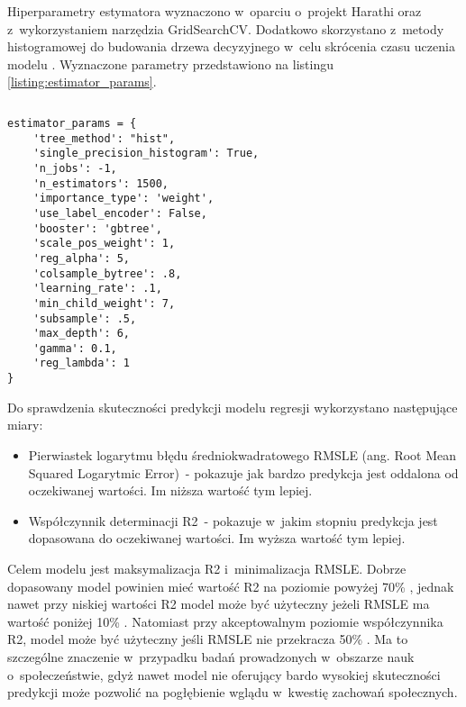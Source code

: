 Hiperparametry estymatora wyznaczono w~oparciu o~projekt Harathi \cite{harathi-2018} oraz z~wykorzystaniem narzędzia GridSearchCV.
Dodatkowo skorzystano z~metody histogramowej do budowania drzewa decyzyjnego w~celu skrócenia czasu uczenia modelu \cite{golarnyk-2021}.
Wyznaczone parametry przedstawiono na listingu \ref{listing:estimator_params}.


\noindent\begin{minipage}{\textwidth}
             \begin{lstlisting}[caption={Parametry estmatora}, label={listing:estimator_params}]
             \end{lstlisting}
             \hspace{.075\textwidth}\begin{minipage}{.85\textwidth}
                                        \begin{verbatim}
estimator_params = {
    'tree_method': "hist",
    'single_precision_histogram': True,
    'n_jobs': -1,
    'n_estimators': 1500,
    'importance_type': 'weight',
    'use_label_encoder': False,
    'booster': 'gbtree',
    'scale_pos_weight': 1,
    'reg_alpha': 5,
    'colsample_bytree': .8,
    'learning_rate': .1,
    'min_child_weight': 7,
    'subsample': .5,
    'max_depth': 6,
    'gamma': 0.1,
    'reg_lambda': 1
}
                                        \end{verbatim}
             \end{minipage}

             \raggedright\source{\ownwork}
             \vspace{0.75cm}
\end{minipage}

Do sprawdzenia skuteczności predykcji modelu regresji wykorzystano następujące miary:
\begin{itemize}
    \item Pierwiastek logarytmu błędu średniokwadratowego RMSLE (ang. Root Mean Squared Logarytmic Error)~- pokazuje jak bardzo predykcja jest oddalona od oczekiwanej wartości. Im niższa wartość tym lepiej.
    \item Współczynnik determinacji R2~- pokazuje w~jakim stopniu predykcja jest dopasowana do oczekiwanej wartości. Im wyższa wartość tym lepiej.
\end{itemize}

Celem modelu jest maksymalizacja R2 i~minimalizacja RMSLE. Dobrze dopasowany model powinien mieć wartość R2 na poziomie powyżej 70\% \cite{r2-good-value}, jednak nawet przy niskiej wartości R2 model może być użyteczny jeżeli RMSLE ma wartość poniżej 10\% \cite{r2-vs-rmse}.
Natomiast przy akceptowalnym poziomie współczynnika R2, model może być użyteczny jeśli RMSLE nie przekracza 50\% \cite{rmse-good-value}.
Ma to szczególne znaczenie w~przypadku badań prowadzonych w~obszarze nauk o~społeczeństwie, gdyż nawet model nie oferujący bardo wysokiej skuteczności predykcji może pozwolić na pogłębienie wglądu w~kwestię zachowań społecznych.

